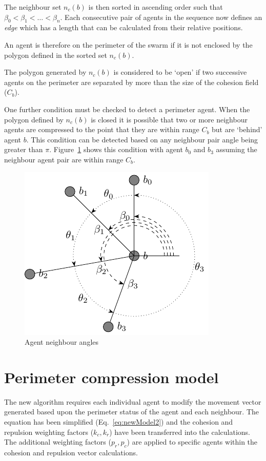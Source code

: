 \documentclass[12pt,a4paper]{IEEEtran}
\begin{document}
The neighbour set $n_c(b)$ is then sorted in ascending order such that $\beta_0 < \beta_1 < \ldots < \beta_n$. Each consecutive pair of agents in the sequence now defines an \textit{edge} which has a length that can be calculated from their relative positions.

An agent is therefore on the perimeter of the swarm if it is not enclosed by the polygon defined in the sorted set $n_c(b)$. 

The polygon generated by $n_c(b)$ is considered to be `open' if two successive agents on the perimeter are separated by more than the size of the cohesion field ($C_b$).  

One further condition must be checked to detect a perimeter agent. When the polygon defined by $n_c(b)$ is closed it is possible that two or more neighbour agents are compressed to the point that they are within range $C_b$ but are `behind' agent $b$. This condition can be detected based on any neighbour pair angle being greater than $\pi$. Figure~\ref{fig:neighbours3} shows this condition with agent $b_0$ and $b_3$ assuming the neighbour agent pair are within range $C_b$. 

\begin{figure}[H]
	\centering
	\includegraphics[width=0.8\linewidth]{figures/neighbours3}
	\caption[Agent neighbours]{Agent neighbour angles}
	\label{fig:neighbours3}
\end{figure}

\section{Perimeter compression model}
The new algorithm requires each individual agent to modify the movement vector generated based upon the perimeter status of the agent and each neighbour. The equation has been simplified (Eq.~\ref{eq:newModel2}) and the cohesion and repulsion weighting factors ($k_c,k_r$) have been transferred into the calculations. The additional weighting factors ($p_r,p_c$) are applied to specific agents within the cohesion and repulsion vector calculations.
\end{document}
